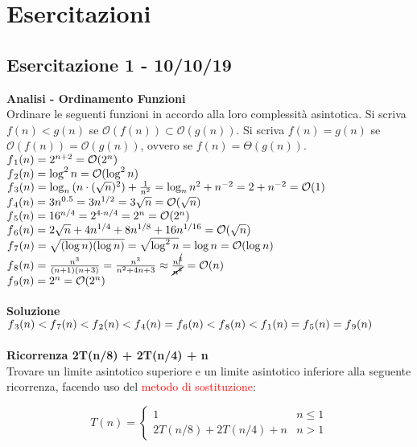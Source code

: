 \documentclass[../cheatSheetAlgoritmi.tex]{subfiles}
\begin{document}
\section{Esercitazioni} 
\subsection{Esercitazione 1 - 10/10/19}
\textbf{Analisi - Ordinamento Funzioni}\\
Ordinare le seguenti funzioni in accordo alla loro complessità asintotica. Si scriva $f(n) < g(n)$ se $\mathcal{O}(f(n)) \subset \mathcal{O}(g(n))$. Si scriva $f(n) = g(n)$ se $\mathcal{O}(f(n)) = \mathcal{O}(g(n))$, ovvero se $f(n) = \Theta(g(n))$.\\
$f\textsubscript{1}(n) = 2^{n+2} = \mathcal{O}(2^{n})$\\
$f\textsubscript{2}(n) = \log^{2}{n} = \mathcal{O}(\log^{2}{n})$\\
$f\textsubscript{3}(n) = \log_{n}{(n \cdot (\sqrt{n})^{2})} + \frac{1}{n^{2}} = \log_{n}{n^{2}} + {n^{-2}} = 2 + {n^{-2}} = \mathcal{O}(1)$\\
$f\textsubscript{4}(n) = 3n^{0.5} = 3n^{1/2} = 3 \sqrt{n} = \mathcal{O}(\sqrt{n})$\\
$f\textsubscript{5}(n) = 16^{n/4} = 2^{4 \cdot n/4} = 2^{n} = \mathcal{O}(2^{n})$\\
$f\textsubscript{6}(n) =2 \sqrt{n} + 4n^{1/4} + 8n^{1/8} + 16n^{1/16} = \mathcal{O}(\sqrt{n})$\\
$f\textsubscript{7}(n) = \sqrt{(\log{n})(\log{n})} = \sqrt{\log^{2}{n}} = \log{n} = \mathcal{O}(\log{n})$\\
$f\textsubscript{8}(n) = \frac{n^3}{(n+1)(n+3)} = \frac{n^3}{n^{2} + 4n + 3} \approx \frac{n^{\cancel{3}}}{\cancel{n^{2}}} = \mathcal{O}(n)$\\
$f\textsubscript{9}(n) = 2^{n} = \mathcal{O}(2^{n})$\\\\
\textbf{Soluzione}\\
$f\textsubscript{3}(n) < f\textsubscript{7}(n) < f\textsubscript{2}(n) < f\textsubscript{4}(n) = f\textsubscript{6}(n) < f\textsubscript{8}(n) < f\textsubscript{1}(n) = f\textsubscript{5}(n) = f\textsubscript{9}(n)$\\\\
\textbf{Ricorrenza 2T(n/8) + 2T(n/4) + n}\\
Trovare un limite asintotico superiore e un limite asintotico inferiore alla seguente ricorrenza, facendo uso del \textcolor{red}{metodo di sostituzione}:
\begin{center}
	\begin{equation*}
		T(n)=\begin{cases}
			1 & \text{$n \leq 1$}\\
			2T(n/8) + 2T(n/4) + n & \text{$n > 1$}
 	 	\end{cases}
	\end{equation*}
\end{center}
\end{document}
